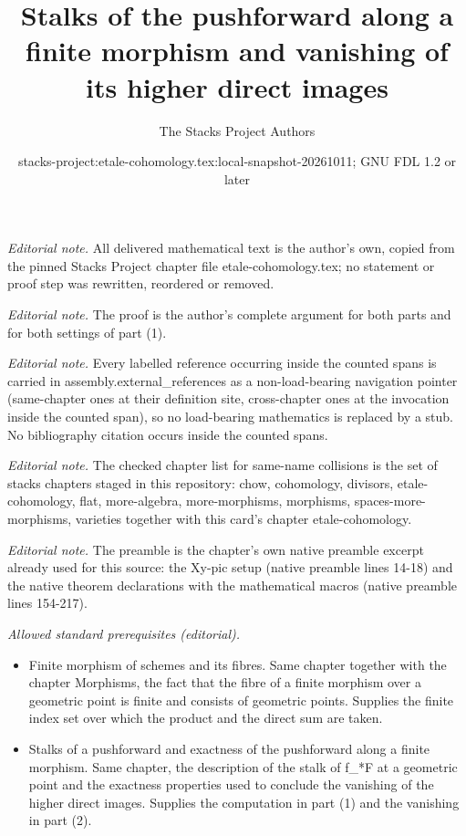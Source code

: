 \documentclass[10pt,a4paper]{amsart}
\title{Stalks of the pushforward along a finite morphism and vanishing of its higher direct images}
\author{The Stacks Project Authors}
\date{stacks-project:etale-cohomology.tex:local-snapshot-20261011; GNU FDL 1.2 or later}
\theoremstyle{plain}
\theoremstyle{definition}
\theoremstyle{remark}
\numberwithin{equation}{subsection}
\begin{document}
\maketitle
\noindent\textit{Editorial note.} All delivered mathematical text is the author's own, copied from the pinned Stacks Project chapter file etale-cohomology.tex; no statement or proof step was rewritten, reordered or removed.\par\medskip
\noindent\textit{Editorial note.} The proof is the author's complete argument for both parts and for both settings of part (1).\par\medskip
\noindent\textit{Editorial note.} Every labelled reference occurring inside the counted spans is carried in assembly.external\_references as a non-load-bearing navigation pointer (same-chapter ones at their definition site, cross-chapter ones at the invocation inside the counted span), so no load-bearing mathematics is replaced by a stub. No bibliography citation occurs inside the counted spans.\par\medskip
\noindent\textit{Editorial note.} The checked chapter list for same-name collisions is the set of stacks chapters staged in this repository: chow, cohomology, divisors, etale-cohomology, flat, more-algebra, more-morphisms, morphisms, spaces-more-morphisms, varieties together with this card's chapter etale-cohomology.\par\medskip
\noindent\textit{Editorial note.} The preamble is the chapter's own native preamble excerpt already used for this source: the Xy-pic setup (native preamble lines 14-18) and the native theorem declarations with the mathematical macros (native preamble lines 154-217).\par\medskip
\noindent\textit{Allowed standard prerequisites (editorial).}\begin{itemize}
\item Finite morphism of schemes and its fibres. Same chapter together with the chapter Morphisms, the fact that the fibre of a finite morphism over a geometric point is finite and consists of geometric points. Supplies the finite index set over which the product and the direct sum are taken.
\item Stalks of a pushforward and exactness of the pushforward along a finite morphism. Same chapter, the description of the stalk of f\_*F at a geometric point and the exactness properties used to conclude the vanishing of the higher direct images. Supplies the computation in part (1) and the vanishing in part (2).
\end{itemize}\medskip
\end{document}
